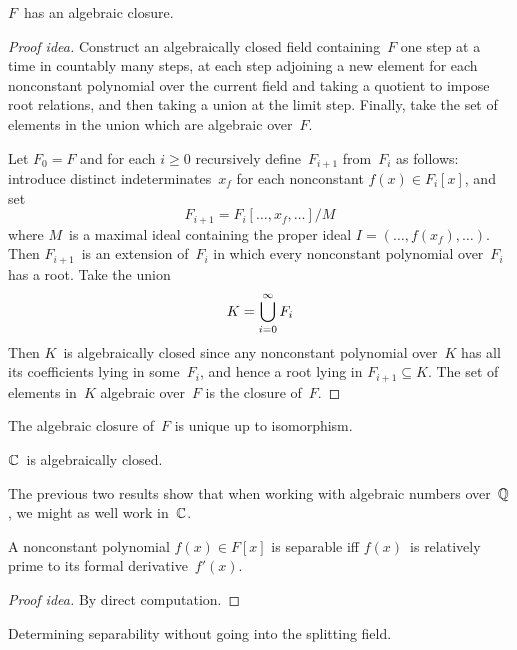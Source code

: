\begin{thm}
\(F\)~has an algebraic closure.
\end{thm}
\begin{proof}[Proof idea]
Construct an algebraically closed field containing~\(F\) one step at a time in countably many steps, at each step adjoining a new element for each nonconstant polynomial over the current field and taking a quotient to impose root relations, and then taking a union at the limit step. Finally, take the set of elements in the union which are algebraic over~\(F\).

Let \(F_0=F\) and for each \(i\ge0\) recursively define~\(F_{i+1}\) from~\(F_i\) as follows: introduce distinct indeterminates~\(x_f\) for each nonconstant \(f(x)\in F_i[x]\), and set
\[F_{i+1}=F_i[\ldots,x_f,\ldots]/M\]
where \(M\)~is a maximal ideal containing the proper ideal \(I=(\ldots,f(x_f),\ldots)\). Then \(F_{i+1}\)~is an extension of~\(F_i\) in which every nonconstant polynomial over~\(F_i\) has a root. Take the union
\[K=\bigcup_{i=0}^{\infty} F_i\]
Then \(K\)~is algebraically closed since any nonconstant polynomial over~\(K\) has all its coefficients lying in some~\(F_i\), and hence a root lying in \(F_{i+1}\subseteq K\). The set of elements in~\(K\) algebraic over~\(F\) is the closure of~\(F\).
\end{proof}

\begin{thm}
The algebraic closure of~\(F\) is unique up to isomorphism.
\end{thm}

\begin{thm}
\(\mathbb{C}\)~is algebraically closed.
\end{thm}

\begin{rmk}
The previous two results show that when working with algebraic numbers over~\(\mathbb{Q}\), we might as well work in~\(\mathbb{C}\).
\end{rmk}

\begin{thm}
A nonconstant polynomial \(f(x)\in F[x]\) is separable iff \(f(x)\)~is relatively prime to its formal derivative~\(f'(x)\).
\end{thm}
\begin{proof}[Proof idea]
By direct computation.
\end{proof}
\begin{app}
Determining separability without going into the splitting field.
\end{app}

